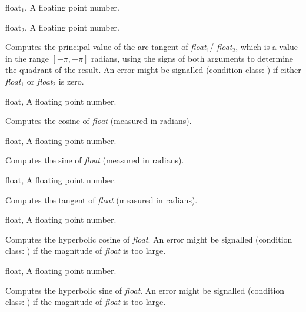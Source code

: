 \begin{optDefinition}
%
\begin{genericargs}
    \item[float$_1$, \classref{float}] A floating point number.
    \item[float$_2$, \classref{float}] A floating point number.
\end{genericargs}
%
\result%
Computes the principal value of the arc tangent of {\em float$_1$}/{\em
    float$_2$}, which is a value in the range $[-\pi,+\pi]$ radians, using the
signs of both arguments to determine the quadrant of the result.  An error might
be signalled (condition-class:
) if either {\em
    float$_1$} or {\em float$_2$} is zero.

%
\begin{genericargs}
    \item[float, \classref{float}] A floating point number.
\end{genericargs}
%
\result%
Computes the cosine of {\em float} (measured in radians).

%
\begin{genericargs}
    \item[float, \classref{float}] A floating point number.
\end{genericargs}
%
\result%
Computes the sine of {\em float} (measured in radians).

%
\begin{genericargs}
    \item[float, \classref{float}] A floating point number.
\end{genericargs}
%
\result%
Computes the tangent of {\em float} (measured in radians).

%
\begin{genericargs}
    \item[float, \classref{float}] A floating point number.
\end{genericargs}
%
\result%
Computes the hyperbolic cosine of {\em float}.  An error might be signalled
(condition class:
) if the magnitude
of {\em float} is too large.

%
\begin{genericargs}
    \item[float, \classref{float}] A floating point number.
\end{genericargs}
%
\result%
Computes the hyperbolic sine of {\em float}.  An error might be signalled
(condition class:
) if the magnitude
of {\em float} is too large.


\end{optDefinition}
